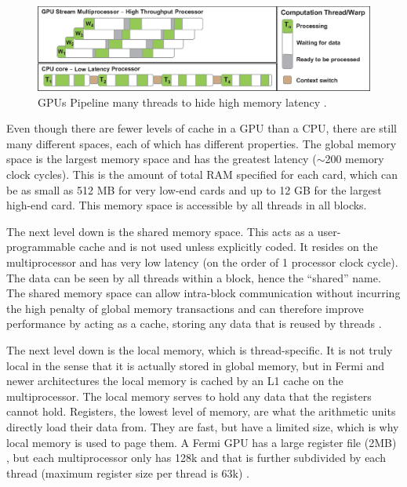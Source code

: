 \begin{figure}[h!] 
  \centering
    \includegraphics[width=\textwidth]{graphics/pipeline.eps}
     \caption[GPUs Pipeline many threads to hide high memory latency.]{GPUs Pipeline many threads to hide high memory latency \cite{cuda_gtc_pres}. \label{pipeline}}
\end{figure}

Even though there are fewer levels of cache in a GPU than a CPU, there are still many different spaces, each of which has different properties.  The global memory space is the largest memory space and has the greatest latency ($\sim$200 memory clock cycles).  This is the amount of total RAM specified for each card, which can be as small as 512 MB for very low-end cards and up to 12 GB for the largest high-end card.  This memory space is accessible by all threads in all blocks.  

The next level down is the shared memory space.  This acts as a user-programmable cache and is not used unless explicitly coded.  It resides on the multiprocessor and has very low latency (on the order of 1 processor clock cycle). The data can be seen by all threads within a block, hence the ``shared'' name.  The shared memory space can allow intra-block communication  without incurring the high penalty of global memory transactions and can therefore improve performance by acting as a cache, storing any data that is reused by threads \cite{cuda}.  

The next level down is the local memory, which is thread-specific.  It is not truly local in the sense that it is actually stored in global memory, but in Fermi and newer architectures the local memory is cached by an L1 cache on the multiprocessor.  The local memory serves to hold any data that the registers cannot hold.  Registers, the lowest level of memory, are what the arithmetic units directly load their data from.  They are fast, but have a limited size, which is why local memory is used to page them.  A Fermi GPU  has a large register file (2MB) %
, but each multiprocessor only has 128k and that is further subdivided by each thread (maximum register size per thread is 63k) \cite{fermi}.


